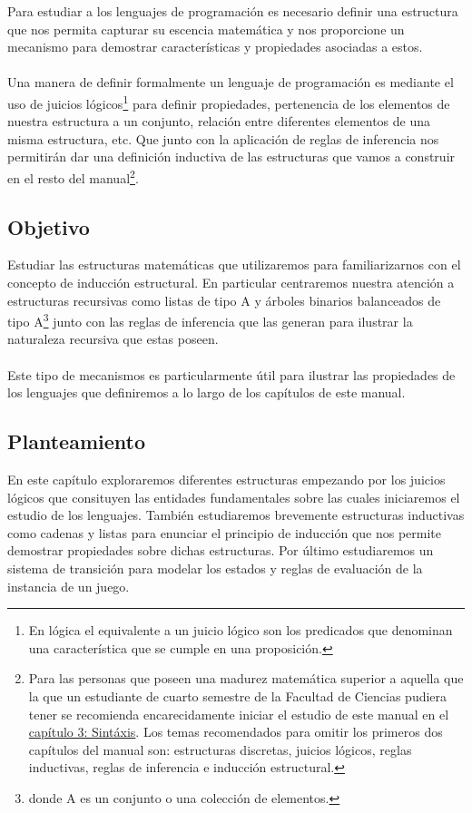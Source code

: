 Para estudiar a los lenguajes de programación es necesario definir una estructura que nos permita capturar su escencia matemática y nos proporcione un mecanismo para demostrar características y propiedades asociadas a estos. \\\\
Una manera de definir formalmente un lenguaje de programación es mediante el uso de juicios lógicos\footnote{En lógica el equivalente a un juicio lógico son los predicados que denominan una característica que se cumple en una proposición.} para definir propiedades, pertenencia de los elementos de nuestra estructura a un conjunto, relación entre diferentes elementos de una misma estructura, etc. Que junto con la aplicación de reglas de inferencia nos permitirán dar una definición inductiva de las estructuras que vamos a construir en el resto del manual\footnote{Para las personas que poseen una madurez matemática superior a aquella que la que un estudiante de cuarto semestre de la Facultad de Ciencias pudiera tener se recomienda encarecidamente iniciar el estudio de este manual en el \hyperref[sec:sintax]{capítulo 3: Sintáxis}. Los temas recomendados para omitir los primeros dos capítulos del manual son: estructuras discretas, juicios lógicos, reglas inductivas, reglas de inferencia e inducción estructural. }. \\
\subsection*{Objetivo}
Estudiar las estructuras matemáticas que utilizaremos para familiarizarnos con el concepto de inducción estructural. En particular centraremos nuestra atención a estructuras recursivas como listas de tipo A y árboles binarios balanceados de tipo A\footnote{donde A es un conjunto o una colección de elementos.} junto con las reglas de inferencia que las generan para ilustrar la naturaleza recursiva que estas poseen.\\\\
Este tipo de mecanismos es particularmente útil para ilustrar las propiedades de los lenguajes que definiremos a lo largo de los capítulos de este manual.

\subsection*{Planteamiento}
En este capítulo exploraremos diferentes estructuras empezando por los juicios lógicos que consituyen las entidades fundamentales sobre las cuales iniciaremos el estudio de los lenguajes.
También estudiaremos brevemente estructuras inductivas como cadenas y listas para enunciar el principio de inducción que nos permite demostrar propiedades sobre dichas estructuras. Por último estudiaremos un sistema de transición para modelar los estados y reglas de evaluación de la instancia de un juego.

